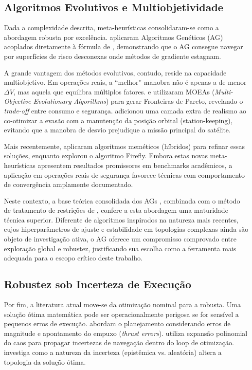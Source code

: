 \subsection{Algoritmos Evolutivos e Multiobjetividade}

Dada a complexidade descrita, meta-heurísticas consolidaram-se como a abordagem robusta por excelência.  aplicaram Algoritmos Genéticos (AG) acoplados diretamente à fórmula de , demonstrando que o AG consegue navegar por superfícies de risco desconexas onde métodos de gradiente estagnam.

A grande vantagem dos métodos evolutivos, contudo, reside na capacidade multiobjetivo. Em operações reais, a ``melhor'' manobra não é apenas a de menor $\Delta V$, mas aquela que equilibra múltiplos fatores.  e  utilizaram MOEAs (\textit{Multi-Objective Evolutionary Algorithms}) para gerar Fronteiras de Pareto, revelando o \textit{trade-off} entre consumo e segurança.  adicionou uma camada extra de realismo ao co-otimizar a evasão com a manutenção da posição orbital (station-keeping), evitando que a manobra de desvio prejudique a missão principal do satélite.

Mais recentemente,  aplicaram algoritmos meméticos (híbridos) para refinar essas soluções, enquanto  explorou o algoritmo Firefly. Embora estas novas meta-heurísticas apresentem resultados promissores em benchmarks acadêmicos, a aplicação em operações reais de segurança favorece técnicas com comportamento de convergência amplamente documentado.

Neste contexto, a base teórica consolidada dos AGs \cite{Goldberg1989}, combinada com o método de tratamento de restrições de , confere a esta abordagem uma maturidade técnica superior. Diferente de algoritmos inspirados na natureza mais recentes, cujos hiperparâmetros de ajuste e estabilidade em topologias complexas ainda são objeto de investigação ativa, o AG oferece um compromisso comprovado entre exploração global e robustez, justificando sua escolha como a ferramenta mais adequada para o escopo crítico deste trabalho.

\subsection{Robustez sob Incerteza de Execução}

Por fim, a literatura atual move-se da otimização nominal para a robusta. Uma solução ótima matemática pode ser operacionalmente perigosa se for sensível a pequenos erros de execução.  abordam o planejamento considerando erros de magnitude e apontamento do empuxo (\textit{thrust errors}).  utiliza expansão polinomial do caos para propagar incertezas de navegação dentro do loop de otimização.  investiga como a natureza da incerteza (epistêmica vs. aleatória) altera a topologia da solução ótima.

